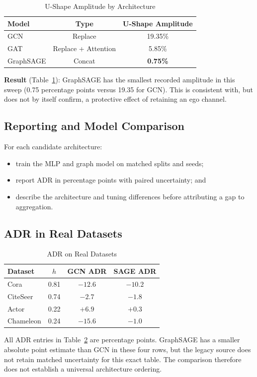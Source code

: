 \begin{table}[t]
\centering
\caption{U-Shape Amplitude by Architecture}
\label{tab:ushape_amplitude}
\begin{tabular}{@{}lcc@{}}
\toprule
Model & Type & U-Shape Amplitude \\
\midrule
GCN & Replace & 19.35\% \\
GAT & Replace + Attention & 5.85\% \\
GraphSAGE & Concat & \textbf{0.75\%} \\
\bottomrule
\end{tabular}
\end{table}

\textbf{Result} (Table~\ref{tab:ushape_amplitude}): GraphSAGE has the smallest recorded amplitude in this sweep (0.75 percentage points versus 19.35 for GCN). This is consistent with, but does not by itself confirm, a protective effect of retaining an ego channel.

\subsection{Reporting and Model Comparison}

\begin{tcolorbox}[colback=blue!5!white,colframe=blue!75!black,title=Matched Comparison Checklist]
For each candidate architecture:
\begin{itemize}
    \item train the MLP and graph model on matched splits and seeds;
    \item report ADR in percentage points with paired uncertainty; and
    \item describe the architecture and tuning differences before attributing a gap to aggregation.
\end{itemize}
\end{tcolorbox}

\subsection{ADR in Real Datasets}

\begin{table}[t]
\centering
\caption{ADR on Real Datasets}
\label{tab:adr_real}
\small
\begin{tabular}{@{}lccc@{}}
\toprule
Dataset & $h$ & GCN ADR & SAGE ADR \\
\midrule
Cora & 0.81 & $-12.6$ & $-10.2$ \\
CiteSeer & 0.74 & $-2.7$ & $-1.8$ \\
Actor & 0.22 & $+6.9$ & $+0.3$ \\
Chameleon & 0.24 & $-15.6$ & $-1.0$ \\
\bottomrule
\end{tabular}
\end{table}

All ADR entries in Table~\ref{tab:adr_real} are percentage points. GraphSAGE has a smaller absolute point estimate than GCN in these four rows, but the legacy source does not retain matched uncertainty for this exact table. The comparison therefore does not establish a universal architecture ordering.
